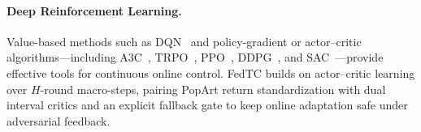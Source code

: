 \paragraph{Deep Reinforcement Learning.}
Value-based methods such as DQN~\cite{mnih2015human,schaul2015prioritized} and policy-gradient or actor--critic algorithms---including A3C~\cite{mnih2016asynchronous}, TRPO~\cite{schulman2015trust}, PPO~\cite{schulman2017proximal}, DDPG~\cite{silver2014deterministic,lillicrap2015continuous}, and SAC~\cite{haarnoja2018soft}---provide effective tools for continuous online control. FedTC builds on actor--critic learning over $H$-round macro-steps, pairing PopArt return standardization with dual interval critics and an explicit fallback gate to keep online adaptation safe under adversarial feedback.
